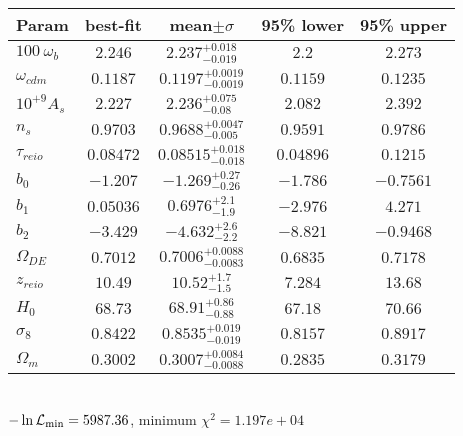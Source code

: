 \begin{tabular}{|l|c|c|c|c|} 
 \hline 
Param & best-fit & mean$\pm\sigma$ & 95\% lower & 95\% upper \\ \hline 
$100~\omega_{b }$ &$2.246$ & $2.237_{-0.019}^{+0.018}$ & $2.2$ & $2.273$ \\ 
$\omega_{cdm }$ &$0.1187$ & $0.1197_{-0.0019}^{+0.0019}$ & $0.1159$ & $0.1235$ \\ 
$10^{+9}A_{s }$ &$2.227$ & $2.236_{-0.08}^{+0.075}$ & $2.082$ & $2.392$ \\ 
$n_{s }$ &$0.9703$ & $0.9688_{-0.005}^{+0.0047}$ & $0.9591$ & $0.9786$ \\ 
$\tau_{reio }$ &$0.08472$ & $0.08515_{-0.018}^{+0.018}$ & $0.04896$ & $0.1215$ \\ 
$b_{0 }$ &$-1.207$ & $-1.269_{-0.26}^{+0.27}$ & $-1.786$ & $-0.7561$ \\ 
$b_{1 }$ &$0.05036$ & $0.6976_{-1.9}^{+2.1}$ & $-2.976$ & $4.271$ \\ 
$b_{2 }$ &$-3.429$ & $-4.632_{-2.2}^{+2.6}$ & $-8.821$ & $-0.9468$ \\ 
$\Omega_{DE}$ &$0.7012$ & $0.7006_{-0.0083}^{+0.0088}$ & $0.6835$ & $0.7178$ \\ 
$z_{reio }$ &$10.49$ & $10.52_{-1.5}^{+1.7}$ & $7.284$ & $13.68$ \\ 
$H_{0 }$ &$68.73$ & $68.91_{-0.88}^{+0.86}$ & $67.18$ & $70.66$ \\ 
$\sigma_8$ &$0.8422$ & $0.8535_{-0.019}^{+0.019}$ & $0.8157$ & $0.8917$ \\ 
$\Omega_{m }$ &$0.3002$ & $0.3007_{-0.0088}^{+0.0084}$ & $0.2835$ & $0.3179$ \\ 
\hline 
 \end{tabular} \\ 
$-\ln{\cal L}_\mathrm{min} =5987.36$, minimum $\chi^2=1.197e+04$ \\ 
